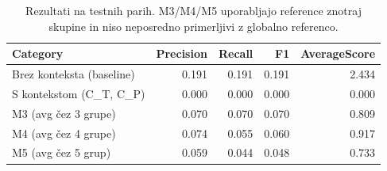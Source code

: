 \begin{table}[h]
\centering
\caption{Rezultati na testnih parih. M3/M4/M5 uporabljajo reference znotraj skupine in niso neposredno primerljivi z globalno referenco.}
\label{tab:table_4_5}
\begin{tabular}{lrrrr}
\toprule
Category & Precision & Recall & F1 & AverageScore \\
\midrule
Brez konteksta (baseline) & 0.191 & 0.191 & 0.191 & 2.434 \\
S kontekstom (C\_T, C\_P) & 0.000 & 0.000 & 0.000 & 0.000 \\
M3 (avg čez 3 grupe) & 0.070 & 0.070 & 0.070 & 0.809 \\
M4 (avg čez 4 grupe) & 0.074 & 0.055 & 0.060 & 0.917 \\
M5 (avg čez 5 grup) & 0.059 & 0.044 & 0.048 & 0.733 \\
\bottomrule
\end{tabular}

\end{table}
